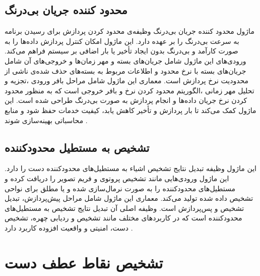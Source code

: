 \subsection{محدود کننده جریان بی‌درنگ\protect{}}
ماژول محدود کننده جریان بی‌درنگ وظیفه‌ی محدود کردن پردازش برای رسیدن برنامه به سرعت بی‌درنگ را بر عهده دارد. این ماژول امکان کنترل پردازش داده‌ها را به صورت کارآمد و بی‌درنگ بدون ایجاد تأخیر یا بار اضافی 
بر سیستم فراهم می‌کند.  ورودی‌های این ماژول شامل جریان‌های بسته و مهر زمان‌ها  و خروجی‌های آن شامل جریان‌های بسته با نرخ محدود و اطلاعات مربوط به 
بسته‌های حذف شده‌ی ناشی از محدودیت نرخ پردازش است. معماری این ماژول شامل مراحل بافر ورودی ،تجزیه و تحلیل مهر زمانی ،الگوریتم محدود کردن نرخ  و
بافر خروجی است که به منظور محدود کردن نرخ جریان داده‌ها و انجام پردازش به صورت بی‌درنگ طراحی شده است. این ماژول کمک می‌کند تا بار پردازش و تأخیر کاهش یابد، کیفیت خدمات حفظ شود و منابع محاسباتی بهینه‌سازی شوند \cite{zhang2020mediapipe}.

\subsection{تشخیص به مستطیل محدودکننده\protect{}}
این ماژول وظیفه تبدیل نتایج تشخیص اشیاء به مستطیل‌های محدودکننده دست را دارد. این ماژول ورودی‌هایی مانند تشخیص پروتوی و فریم تصویر را دریافت کرده و مستطیل‌های محدودکننده را به صورت 
نرمال‌سازی شده و یا مطلق برای نواحی تشخیص داده شده تولید می‌کند. معماری این ماژول شامل مراحل  پیش‌پردازش، تبدیل تشخیص و پس‌پردازش است. وظیفه اصلی آن تبدیل نتایج تشخیص به 
مستطیل‌های محدودکننده است که در کاربردهای مختلف مانند تشخیص و ردیابی چهره، تشخیص دست، امنیتی و واقعیت افزوده کاربرد دارد \cite{zhang2020mediapipe}.


\section{تشخیص نقاط عطف دست\protect{}}
